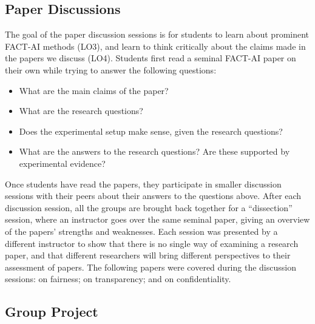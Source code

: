 \subsection{Paper Discussions}
The goal of the paper discussion sessions is for students to learn about prominent FACT-AI methods (LO3), and learn to think critically about the claims made in the papers we discuss (LO4). 
Students first read a seminal FACT-AI paper on their own while trying to answer the following questions: 
\begin{itemize}
\item What are the main claims of the paper?
\item What are the research questions?
\item Does the experimental setup make sense, given the research questions?
\item What are the answers to the research questions? Are these supported by experimental evidence?
\end{itemize}

\noindent%
Once students have read the papers, they participate in smaller discussion sessions with their peers about their answers to the questions above. 
After each discussion session, all the groups are brought back together for a ``dissection'' session, where an instructor goes over the same seminal paper, giving an overview of the papers' strengths and weaknesses. 
%
Each session was presented by a different instructor to show that there is no single way of examining a research paper, and that different researchers will bring different perspectives to their assessment of papers. 
The following papers were covered during the discussion sessions: 
\citet{hardt_equality_2016} on fairness; 
\citet{ribeiro-2016-should} on transparency; and 
\citet{Abadi_2016} on confidentiality.


\subsection{Group Project}
\label{section:assignment}

